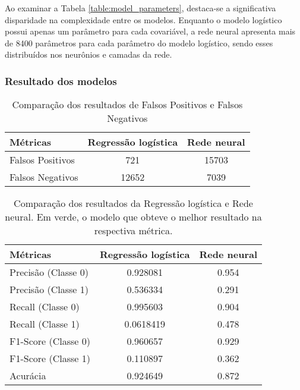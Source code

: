 Ao examinar a Tabela \ref{table:model_parameters}, destaca-se a significativa disparidade na
complexidade entre os modelos. Enquanto o modelo logístico possui apenas um parâmetro para cada covariável,
a rede neural apresenta mais de 8400 parâmetros para cada parâmetro do modelo logístico,  
sendo esses distribuídos nos neurônios e camadas da rede.

\subsubsection{Resultado dos modelos}

\begin{table}[H]
  \centering
  \begin{tabular}{lcc}
    \hline
    \textbf{Métricas} & \textbf{Regressão logística} & \textbf{Rede neural} \\
    \hline
    Falsos Positivos   & 721                     & 15703 \\
    Falsos Negativos   & 12652                   & 7039 \\
    \hline
  \end{tabular}
  \caption{Comparação dos resultados de Falsos Positivos e Falsos Negativos}
  \label{tab:false_positives_negatives}
\end{table}


\begin{table}[H]
  \centering
  \begin{tabular}{lcc}
    \hline
    \textbf{Métricas} & \textbf{Regressão logística} & \textbf{Rede neural} \\
    \hline
    Precisão (Classe 0) & 0.928081                     & \cellcolor{green!25}0.954 \\
    Precisão (Classe 1) & \cellcolor{green!25}0.536334 & 0.291 \\
    Recall   (Classe 0) & \cellcolor{green!25}0.995603 & 0.904 \\
    Recall   (Classe 1) & 0.0618419                    & \cellcolor{green!25}0.478 \\
    F1-Score (Classe 0) & \cellcolor{green!25} 0.960657  & 0.929 \\
    F1-Score (Classe 1) & 0.110897                     & \cellcolor{green!25}0.362 \\
    Acurácia            & \cellcolor{green!25}0.924649   & 0.872 \\
    \hline
  \end{tabular}
  \caption{Comparação dos resultados da Regressão logística e Rede neural. Em verde, o modelo que obteve o melhor resultado na respectiva métrica.}
  \label{tab:comparison_results}
\end{table}

